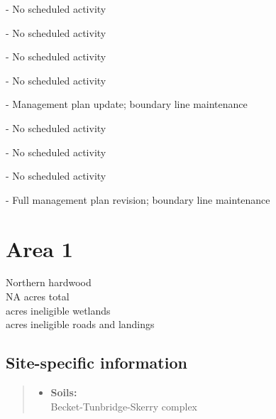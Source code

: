 \documentclass[]{tufte-handout}
\providecommand{\tightlist}{%
  \setlength{\itemsep}{0pt}\setlength{\parskip}{0pt}}
\begin{document}
 - No scheduled activity

\vspace{5pt}

 - No scheduled activity

\vspace{5pt}

 - No scheduled activity

\vspace{5pt}

 - No scheduled activity

\vspace{5pt}

 - Management plan update; boundary line maintenance

\vspace{5pt}

 - No scheduled activity

\vspace{5pt}

 - No scheduled activity

\vspace{5pt}

 - No scheduled activity

\vspace{5pt}

 - Full management plan revision; boundary line
maintenance

\newpage

\section{Area 1}\label{area-1}

Northern hardwood\\
\noindent NA acres total\\
 acres ineligible wetlands\\
 acres ineligible roads and landings

\subsection{Site-specific information}\label{site-specific-information}

\begin{quote}
\begin{itemize}
\tightlist
\item
  \textbf{Soils:}\\
  \indent\indent Becket-Tunbridge-Skerry complex
\end{itemize}
\end{quote}
\end{document}
